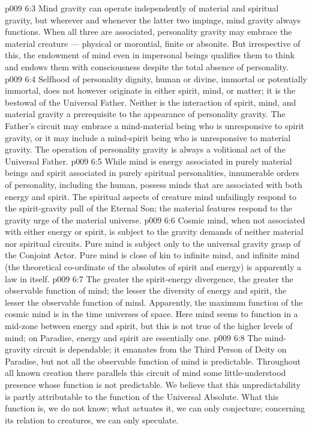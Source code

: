 \vs p009 6:3 \pc Mind gravity can operate independently of material and spiritual gravity, but wherever and whenever the latter two impinge, mind gravity always functions. When all three are associated, personality gravity may embrace the material creature --- physical or morontial, finite or absonite. But irrespective of this, the endowment of mind even in impersonal beings qualifies them to think and endows them with consciousness despite the total absence of personality.
\vs p009 6:4 \pc Selfhood of personality dignity, human or divine, immortal or potentially immortal, does not however originate in either spirit, mind, or matter; it is the bestowal of the Universal Father. Neither is the interaction of spirit, mind, and material gravity a prerequisite to the appearance of personality gravity. The Father’s circuit may embrace a mind\hyp{}material being who is unresponsive to spirit gravity, or it may include a mind\hyp{}spirit being who is unresponsive to material gravity. The operation of personality gravity is always a volitional act of the Universal Father.
\vs p009 6:5 While mind is energy associated in purely material beings and spirit associated in purely spiritual personalities, innumerable orders of personality, including the human, possess minds that are associated with both energy and spirit. The spiritual aspects of creature mind unfailingly respond to the spirit\hyp{}gravity pull of the Eternal Son; the material features respond to the gravity urge of the material universe.
\vs p009 6:6 \pc Cosmic mind, when not associated with either energy or spirit, is subject to the gravity demands of neither material nor spiritual circuits. Pure mind is subject only to the universal gravity grasp of the Conjoint Actor. Pure mind is close of kin to infinite mind, and infinite mind (the theoretical co\hyp{}ordinate of the absolutes of spirit and energy) is apparently a law in itself.
\vs p009 6:7 The greater the spirit\hyp{}energy divergence, the greater the observable function of mind; the lesser the diversity of energy and spirit, the lesser the observable function of mind. Apparently, the maximum function of the cosmic mind is in the time universes of space. Here mind seems to function in a mid\hyp{}zone between energy and spirit, but this is not true of the higher levels of mind; on Paradise, energy and spirit are essentially one.
\vs p009 6:8 \pc The mind\hyp{}gravity circuit is dependable; it emanates from the Third Person of Deity on Paradise, but not all the observable function of mind is predictable. Throughout all known creation there parallels this circuit of mind some little\hyp{}understood presence whose function is not predictable. We believe that this unpredictability is partly attributable to the function of the Universal Absolute. What this function is, we do not know; what actuates it, we can only conjecture; concerning its relation to creatures, we can only speculate.
